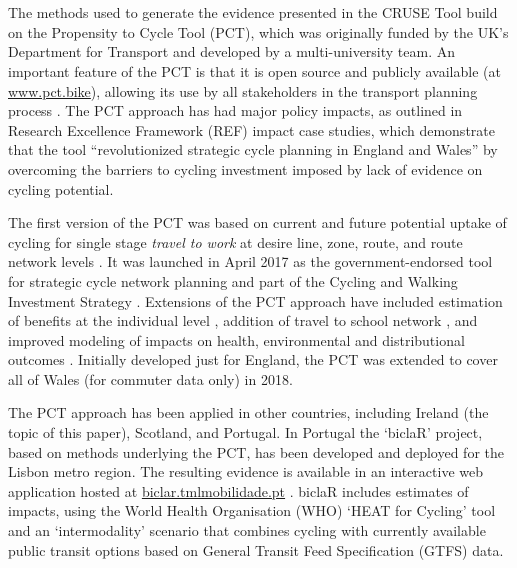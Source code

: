 \documentclass[
  super,
  preprint,
  3p]{elsarticle}
\providecommand{\DIFadd}[1]{{\protect\color{blue}\uwave{#1}}} %
\providecommand{\DIFaddbegin}{} %
\providecommand{\DIFaddend}{} %
\providecommand{\DIFdelbegin}{} %
\providecommand{\DIFdelend}{} %
\newcommand{\DIFscaledelfig}{0.5}
\newlength{\DIFdelgraphicswidth} %
\newlength{\DIFdelgraphicsheight} %
\newcommand{\DIFaddincludegraphics}[2][]{{\color{blue}\fbox{\DIFOincludegraphics[#1]{#2}}}} %
\newcommand{\DIFdelincludegraphics}[2][]{%
\sbox{\DIFdelgraphicsbox}{\DIFOincludegraphics[#1]{#2}}%
\settoboxwidth{\DIFdelgraphicswidth}{\DIFdelgraphicsbox} %
\settoboxtotalheight{\DIFdelgraphicsheight}{\DIFdelgraphicsbox} %
\scalebox{\DIFscaledelfig}{%
\parbox[b]{\DIFdelgraphicswidth}{\usebox{\DIFdelgraphicsbox}\\[-\baselineskip] \rule{\DIFdelgraphicswidth}{0em}}\llap{\resizebox{\DIFdelgraphicswidth}{\DIFdelgraphicsheight}{%
\setlength{\unitlength}{\DIFdelgraphicswidth}%
\begin{picture}(1,1)%
\thicklines\linethickness{2pt} %
{\color[rgb]{1,0,0}\put(0,0){\framebox(1,1){}}}%
{\color[rgb]{1,0,0}\put(0,0){\line( 1,1){1}}}%
{\color[rgb]{1,0,0}\put(0,1){\line(1,-1){1}}}%
\end{picture}%
}\hspace*{3pt}}} %
} %
\DeclareRobustCommand{\DIFaddbegin}{\DIFOaddbegin \let\includegraphics\DIFaddincludegraphics} %
\DeclareRobustCommand{\DIFaddend}{\DIFOaddend \let\includegraphics\DIFOincludegraphics} %
\DeclareRobustCommand{\DIFdelbegin}{\DIFOdelbegin \let\includegraphics\DIFdelincludegraphics} %
\DeclareRobustCommand{\DIFdelend}{\DIFOaddend \let\includegraphics\DIFOincludegraphics} %
\begin{document}
\DIFdelbegin %
\DIFdelend \DIFaddbegin \section{\DIFadd{Methods and data}}\label{sec-methods}
\DIFaddend 

The methods used to generate the evidence presented in the CRUSE Tool
build on the Propensity to Cycle Tool (PCT), which was originally funded
by the UK's Department for Transport and developed by a multi-university
team. An important feature of the PCT is that it is open source and
publicly available (at \href{https://www.pct.bike/}{www.pct.bike}),
allowing its use by all stakeholders in the transport planning process
\citep{lovelace2017}. The PCT approach has had major policy impacts, as
outlined in Research Excellence Framework (REF) impact case studies,
which demonstrate that the tool ``revolutionized strategic cycle
planning in England and Wales'' by overcoming the barriers to cycling
investment imposed by lack of evidence on cycling
potential\citep{lovelace2023}.

The first version of the PCT was based on current and future potential
uptake of cycling for single stage \emph{travel to work} at desire line,
zone, route, and route network levels \citep{lovelace2016}. It was
launched in April 2017 as the government-endorsed tool for strategic
cycle network planning and part of the Cycling and Walking Investment
Strategy \citep{cycling2017}. Extensions of the PCT approach have
included estimation of benefits at the individual level
\citep{woodcock2018}, addition of travel to school network
\citep{goodman2019}, and improved modeling of impacts on health,
environmental and distributional outcomes \citep{woodcock2021}.
Initially developed just for England, the PCT was extended to cover all
of Wales (for commuter data only) in 2018.

The PCT approach has been applied in other countries, including Ireland
(the topic of this paper), Scotland, and Portugal. In Portugal the
`biclaR' project, based on methods underlying the PCT, has been
developed and deployed for the Lisbon metro region. The resulting
evidence is available in an interactive web application hosted at
\href{https://biclar.tmlmobilidade.pt}{biclar.tmlmobilidade.pt}
\citep{felix2023}. biclaR includes estimates of impacts, using the World
Health Organisation (WHO) `HEAT for Cycling' tool and an `intermodality'
scenario that combines cycling with currently available public transit
options based on General Transit Feed Specification (GTFS) data.
\end{document}
